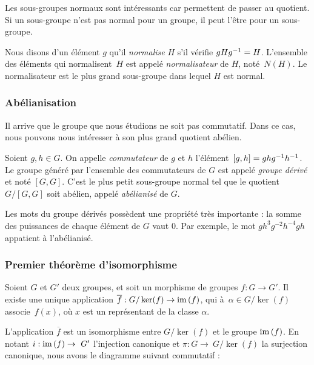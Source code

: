 Les sous-groupes normaux sont intéressants car permettent de passer au quotient. Si un sous-groupe n'est pas normal pour un groupe, il peut l'être pour un sous-groupe.

\begin{definition}\label{def:normalizer}
Nous disons d'un élément $g$ qu'il \emph{normalise} $H$ s'il vérifie $gHg^{-1}=H$. L'ensemble des éléments qui normalisent~$H$ est appelé \emph{normalisateur} de $H$, noté~$N(H)$. Le normalisateur est le plus grand sous-groupe dans lequel $H$ est normal.
\end{definition}

\subsubsection{Abélianisation}

Il arrive que le groupe que nous étudions ne soit pas commutatif. Dans ce cas, nous pouvons nous intéresser à son plus grand quotient abélien.

\begin{definition}\label{def:abelian}
Soient $g,h\in G$. On appelle \emph{commutateur} de $g$ et $h$ l'élément~$[g,h]=ghg^{-1} h^{-1}$. Le groupe généré par l'ensemble des commutateurs de $G$ est appelé \emph{groupe dérivé} et noté $[G,G]$. C'est le plus petit sous-groupe normal tel que le quotient $G/[G,G]$ soit abélien, appelé \emph{abélianisé} de $G$.
\end{definition}

Les mots du groupe dérivés possèdent une propriété très importante : la somme des puissances de chaque élément de $G$ vaut 0. Par exemple, le mot $gh^3g^{-2}h^{-4}gh$ appatient à l'abélianisé. 

\subsubsection{Premier théorème d'isomorphisme}

\begin{theorem}
Soient $G$ et $G'$ deux groupes, et soit un morphisme de groupes $f:G\to G'$. Il existe une unique application $\overline{f}:G/\ker(f)\to \mathrm{im}\,(f)$, qui à~$\alpha\in G/\ker(f)$ associe~$f(x)$, où $x$ est un représentant de la classe $\alpha$.

L'application $\overline{f}$ est un isomorphisme entre $G/\ker(f)$ et le groupe $\mathrm{im}\,(f)$. En notant $i:\mathrm{im}\,(f)\to~G'$ l'injection canonique et $\pi:G\to~G/\ker(f)$ la surjection canonique, nous avons le diagramme suivant commutatif :
\begin{figure}[H]
    \centering
\end{figure}
\end{theorem}

